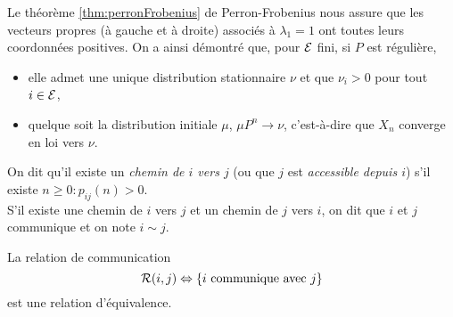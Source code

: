 \remark
Le théorème \ref{thm:perronFrobenius} de Perron-Frobenius nous assure que les vecteurs propres (à gauche et à droite) associés à $\lambda_1 = 1$ ont toutes leurs coordonnées positives. On a ainsi démontré que, pour $\mathcal{E}$ fini, si $P$ est régulière, 
\begin{itemize}
  \item elle admet une unique distribution stationnaire $\nu$ et que $\nu_i > 0$ pour tout $i \in \mathcal{E}$, 
  \item quelque soit la distribution initiale $\mu$, $\mu P^n \to \nu$, c'est-à-dire que $X_n$ converge en loi vers $\nu$.
\end{itemize}


\begin{definition}
  On dit qu'il existe un {\em chemin de $i$ vers $j$} (ou que $j$ est {\em accessible depuis $i$}) s'il existe $n \geq 0: p_{ij}(n) > 0$. \\
  S'il existe une chemin de $i$ vers $j$ et un chemin de $j$ vers $i$, on dit que $i$ et $j$ communique et on note $i \sim j$.
\end{definition}


\begin{proposition}  \label{prop:communicationEquivalence}
  La relation de communication 
  $$
  \mathcal{R}(i, j) \Leftrightarrow \{\text{$i$ communique avec $j$}\}
  $$
  est une relation d'équivalence. 
\end{proposition}

